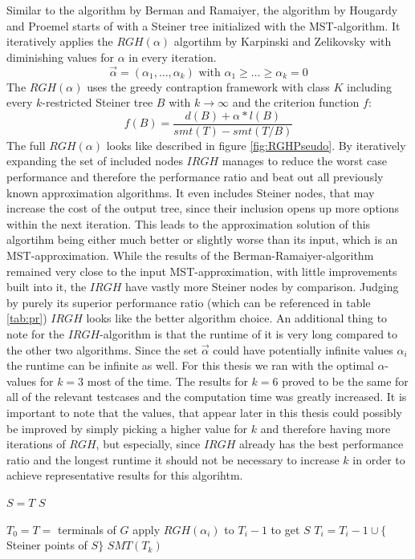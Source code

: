 Similar to the algorithm by Berman and Ramaiyer, the algorithm by Hougardy and Proemel \cite{HoPr99} starts of with a Steiner tree initialized with the MST-algorithm. It iteratively applies the $RGH(\alpha)$ algortihm by Karpinski and Zelikovsky \cite{karpinski1997new} with diminishing values for $\alpha$ in every iteration.$$\vec{\alpha}=(\alpha_1,\dots,\alpha_k) \text{ with } \alpha_1 \geq \dots \geq \alpha_k=0$$ 
The $RGH(\alpha)$ uses the greedy contraption framework \cite{karpinski1997new} with class $K$ including every $k$-restricted Steiner tree $B$ with $k\to\infty$ and the criterion function $f$: $$ f(B) = \frac{d(B) + \alpha * l(B)}{smt(T)-smt(T/B)} $$
The full $RGH(\alpha)$ looks like described in figure \ref{fig:RGHPseudo}.
By iteratively expanding the set of included nodes $IRGH$ manages to reduce the worst case performance and therefore the performance ratio and beat out all previously known approximation algorithms. It even includes Steiner nodes, that may increase the cost of the output tree, since their inclusion opens up more options within the next iteration. This leads to the approximation solution of this algortihm being either much better or slightly worse than its input, which is an MST-approximation.  While the results of the Berman-Ramaiyer-algorithm remained very close to the input MST-approximation, with little improvements built into it, the $IRGH$ have vastly more Steiner nodes by comparison. Judging by purely its superior performance ratio (which can be referenced in table \ref{tab:pr}) $IRGH$ looks like the better algorithm choice. An additional thing to note for the $IRGH$-algorithm is that the runtime of it is very long compared to the other two algorithms. Since the set $\vec{\alpha}$ could have potentially infinite values $\alpha_i$ the runtime can be infinite as well. For this thesis we ran with the optimal $\alpha$-values for $k=3$ most of the time. The results for $k=6$ proved to be the same for all of the relevant testcases and the computation time was greatly increased. It is important to note that the values, that appear later in this thesis could possibly be improved by simply picking a higher value for $k$ and therefore having more iterations of $RGH$, but especially, since $IRGH$ already has the best performance ratio and the longest runtime it should not be necessary to increase $k$ in order to achieve representative results for this algorihtm.  

\begin{algorithm}[h!]
$S=T$\;
 {
}
\KwRet $S$\;

\label{fig:RGHPseudo}
\end{algorithm}


\begin{algorithm}[h!]
$T_0=T=$ terminals of $G$\;
 {
	apply $RGH(\alpha_i)$ to $T_i-1$ to get $S$\;
	$T_i=T_i-1 \cup \{$Steiner points of $S\}$\;
}
\KwRet $SMT(T_k)$\;
\label{fig:IRGHPseudo}
\end{algorithm}
